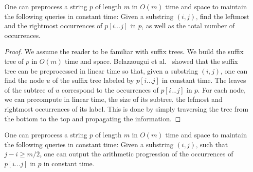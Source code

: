 \begin{proposition}
\label{prop:suffix_tree}
One can preprocess a string $p$ of length $m$ in $O(m)$ time and space to maintain the following queries in constant time: Given a substring $(i,j)$, find the leftmost and the rightmost occurrences of $p[i...j]$ in $p$, as well as the total number of occurrences.  
\end{proposition}
\begin{proof}
We assume the reader to be familiar with suffix trees. We build the suffix tree of $p$ in $O(m)$ time and space. Belazzougui et al.~\cite{belazzougui_et_al:LIPIcs.CPM.2021.8} showed that the suffix tree can be preprocessed in linear time so that, given a substring $(i,j)$, one can find the node $u$ of the suffix tree labeled by $p[i...j]$ in constant time. The leaves of the subtree of $u$ correspond to the occurrences of $p[i...j]$ in $p$.
For each node, we can precompute in linear time, the size of its subtree, the lefmost and rightmost occurrences of its label. This is done by simply traversing the tree from the bottom to the top and propagating the information.
\end{proof}

\begin{corollary}
\label{cor:imp}
One can preprocess a string $p$ of length $m$ in $O(m)$ time and space to maintain the following queries in constant time: Given a substring $(i,j)$, such that $j-i\ge m/2$, one can output the arithmetic progression of the occurrences of $p[i...j]$ in $p$ in constant time.
\end{corollary}



